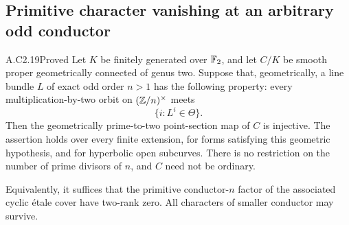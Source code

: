 \subsection{Primitive character vanishing at an arbitrary odd conductor}

\begin{claim}{A.C2.19}{Proved}
Let $K$ be finitely generated over $\mathbb F_2$, and let $C/K$
be smooth proper geometrically connected of genus two.
Suppose that, geometrically, a line bundle $L$ of exact
odd order $n>1$ has the following property: every
multiplication-by-two orbit on $(\mathbb Z/n)^\times$ meets
\[
                         \{i:L^i\in\Theta\}.
\]
Then the geometrically prime-to-two point-section map
of $C$ is injective. The assertion holds over every
finite extension, for forms satisfying this geometric
hypothesis, and for hyperbolic open subcurves.
There is no restriction on the number of prime
divisors of $n$, and $C$ need not be ordinary.

Equivalently, it suffices that the primitive
conductor-$n$ factor of the associated cyclic
\'etale cover have two-rank zero. All characters of
smaller conductor may survive.
\end{claim}
